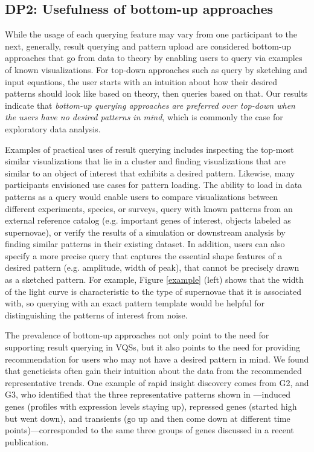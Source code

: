 \subsection{DP2: Usefulness of bottom-up approaches}
\par While the usage of each querying feature may vary from one participant to the next, generally, result querying and pattern upload are considered bottom-up approaches that go from data to theory by enabling users to query via examples of known visualizations. For top-down approaches such as query by sketching and input equations, the user starts with an intuition about how their desired patterns should look like based on theory, then queries based on that. Our results indicate that \emph{bottom-up querying approaches are preferred over top-down when the users have no desired patterns in mind}, which is commonly the case for exploratory data analysis.
\par Examples of practical uses of result querying includes inspecting the top-most similar visualizations that lie in a cluster and finding visualizations that are similar to an object of interest that exhibits a desired pattern. Likewise, many participants envisioned use cases for pattern loading. The ability to load in data patterns as a query would enable users to compare visualizations between different experiments, species, or surveys, query with known patterns from an external reference catalog (e.g. important genes of interest, objects labeled as supernovae), or verify the results of a simulation or downstream analysis by finding similar patterns in their existing dataset. In addition, users can also specify a more precise query that captures the essential shape features of a desired pattern (e.g. amplitude, width of peak), that  cannot be precisely drawn as a sketched pattern. For example, Figure \ref{example} (left) shows that the width of the light curve is characteristic to the type of supernovae that it is associated with, so querying with an exact pattern template would be helpful for distinguishing the patterns of interest from noise.
\par The prevalence of bottom-up approaches not only point to the need for supporting result querying in VQSs, but it also points to the need for providing recommendation for users who may not have a desired pattern in mind. We found that geneticists often gain their intuition about the data from the recommended representative trends. One example of rapid insight discovery comes from G2, and G3, who identified that the three representative patterns shown in \zv---induced genes (profiles with expression levels staying up), repressed genes (started high but went down), and transients (go up and then come down at different time points)---corresponded to the same three groups of genes discussed in a recent publication\cite{Gloss2017}.
